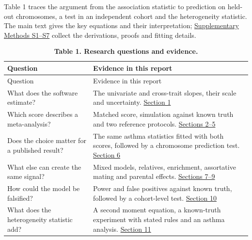 \documentclass[11pt,a4paper]{article}
\begin{document}
Table 1 traces the argument from the association statistic to prediction on held-out chromosomes, a test in an independent cohort and the heterogeneity statistic. The main text gives the key equations and their interpretation; \hyperref[supplementary-methods]{Supplementary Methods S1--S7} collect the derivations, proofs and fitting details.

\begin{longtable}[]{@{}
  >{\raggedright\arraybackslash}p{}
  >{\raggedright\arraybackslash}p{}@{}}
\caption{\textbf{Table 1. Research questions and evidence.}}\tabularnewline
\toprule\noalign{}
\begin{minipage}[b]{\linewidth}\raggedright
Question
\end{minipage} & \begin{minipage}[b]{\linewidth}\raggedright
Evidence in this report
\end{minipage} \\
\midrule\noalign{}
\endfirsthead
\toprule\noalign{}
\begin{minipage}[b]{\linewidth}\raggedright
Question
\end{minipage} & \begin{minipage}[b]{\linewidth}\raggedright
Evidence in this report
\end{minipage} \\
\midrule\noalign{}
\endhead
\bottomrule\noalign{}
\endlastfoot
What does the software estimate? & The univariate and cross-trait slopes, their scale and uncertainty. \hyperref[1-ordinary-ldsc-and-its-estimands]{Section 1} \\
Which score describes a meta-analysis? & Matched score, simulation against known truth and two reference protocols. \hyperref[2-how-a-meta-analysis-changes-the-score]{Sections 2--5} \\
Does the choice matter for a published result? & The same asthma statistics fitted with both scores, followed by a chromosome prediction test. \hyperref[6-what-changed-in-the-gbmi-asthma-analysis]{Section 6} \\
What else can create the same signal? & Mixed models, relatives, enrichment, assortative mating and parental effects. \hyperref[7-a-matched-mixed-model-score-and-the-reason-to-archive-it]{Sections 7--9} \\
How could the model be falsified? & Power and false positives against known truth, followed by a cohort-level test. \hyperref[10-when-can-the-two-scores-be-distinguished]{Section 10} \\
What does the heterogeneity statistic add? & A second moment equation, a known-truth experiment with stated rules and an asthma analysis. \hyperref[11-what-does-cochrans-q-add]{Section 11} \\
\end{longtable}
\end{document}
